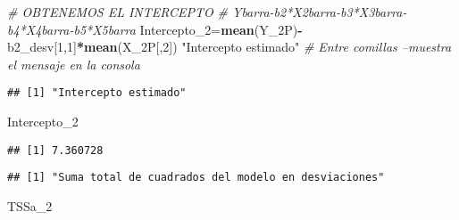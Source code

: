 \documentclass[
]{article}
\newenvironment{Shaded}{\begin{snugshade}}{\end{snugshade}}
\newcommand{\CommentTok}[1]{\textcolor[rgb]{0.56,0.35,0.01}{\textit{#1}}}
\newcommand{\DecValTok}[1]{\textcolor[rgb]{0.00,0.00,0.81}{#1}}
\newcommand{\KeywordTok}[1]{\textcolor[rgb]{0.13,0.29,0.53}{\textbf{#1}}}
\newcommand{\NormalTok}[1]{#1}
\newcommand{\OperatorTok}[1]{\textcolor[rgb]{0.81,0.36,0.00}{\textbf{#1}}}
\newcommand{\StringTok}[1]{\textcolor[rgb]{0.31,0.60,0.02}{#1}}
\begin{document}
\begin{Shaded}
\begin{Highlighting}[]
\CommentTok{# OBTENEMOS EL INTERCEPTO}
\CommentTok{# Ybarra-b2*X2barra-b3*X3barra-b4*X4barra-b5*X5barra}
\NormalTok{Intercepto_}\DecValTok{2}\NormalTok{=}\KeywordTok{mean}\NormalTok{(Y_2P)}\OperatorTok{-}\NormalTok{b2_desv[}\DecValTok{1}\NormalTok{,}\DecValTok{1}\NormalTok{]}\OperatorTok{*}\KeywordTok{mean}\NormalTok{(X_2P[,}\DecValTok{2}\NormalTok{])}
\StringTok{"Intercepto estimado"}  \CommentTok{# Entre comillas --muestra el mensaje en la consola}
\end{Highlighting}
\end{Shaded}

\begin{verbatim}
## [1] "Intercepto estimado"
\end{verbatim}

\begin{Shaded}
\begin{Highlighting}[]
\NormalTok{Intercepto_}\DecValTok{2}
\end{Highlighting}
\end{Shaded}

\begin{verbatim}
## [1] 7.360728
\end{verbatim}

\begin{Shaded}
\end{Shaded}

\begin{verbatim}
## [1] "Suma total de cuadrados del modelo en desviaciones"
\end{verbatim}

\begin{Shaded}
\begin{Highlighting}[]
\NormalTok{TSSa_}\DecValTok{2}
\end{Highlighting}
\end{Shaded}
\end{document}
